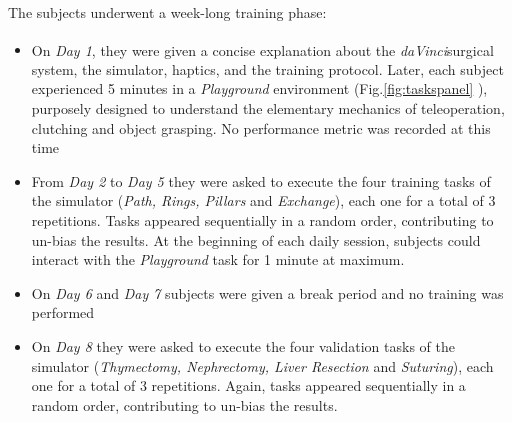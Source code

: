 \documentclass{article}
\newcommand{\cright}{\textsuperscript{\textregistered}\phantom{..}}
\begin{document}
\begin{multicols}{2}
The subjects underwent a week-long training phase:
\begin{itemize}
  \item On \textit{Day 1}, they were given a concise explanation about the \textit{daVinci}\cright surgical system, the simulator, haptics, and the training protocol. Later, each subject experienced 5 minutes in a \textit{Playground} environment (Fig.\ref{fig:taskspanel} ), purposely designed to understand the elementary mechanics of teleoperation, clutching and object grasping. No performance metric was recorded at this time
  \item From \textit{Day 2} to \textit{Day 5} they were asked to execute the four training tasks of the simulator (\textit{Path, Rings, Pillars} and \textit{Exchange}), each one for a total of 3 repetitions. Tasks appeared sequentially in a random order, contributing to un-bias the results. At the beginning of each daily session, subjects could interact with the \textit{Playground} task for 1 minute at maximum.
  \item On \textit{Day 6} and \textit{Day 7} subjects were given a break period and no training was performed
  \item On \textit{Day 8} they were asked to execute the four validation tasks of the simulator (\textit{Thymectomy, Nephrectomy, Liver Resection} and \textit{Suturing}), each one for a total of 3 repetitions. Again, tasks appeared sequentially in a random order, contributing to un-bias the results.
\end{itemize}


\end{multicols}
\end{document}
